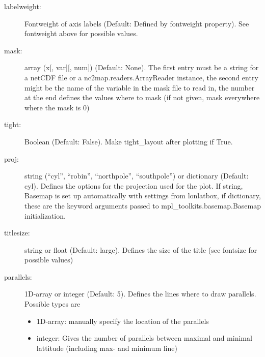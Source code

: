 \begin{description}
    \item[\gls*{labelweight}:] \label{item:labelweight}  Fontweight of axis labels (Default: Defined by fontweight property). See fontweight above for possible values.
    \item[\gls*{mask}:] \label{item:mask}  array (x[, var][, num]) (Default: None). The first entry must be a string for a netCDF file or a nc2map.readers.ArrayReader instance, the second entry might be the name of the variable in the mask file to read in, the number at the end defines the values where to mask (if not given, mask everywhere where the mask is 0)
    \item[\gls*{tight}:] \label{item:tight} Boolean (Default: False). Make tight\_layout after plotting if True.
    \item[\gls*{proj}:] \label{item:proj}  string (\enquote{cyl}, \enquote{robin}, \enquote{northpole}, \enquote{southpole}) or dictionary (Default: cyl). Defines the options for the projection used for the plot. If string, Basemap is set up automatically with settings from lonlatbox, if dictionary, these are the keyword arguments passed to mpl\_toolkits.basemap.Basemap initialization.
    \item[\gls*{titlesize}:] \label{item:titlesize}  string or float (Default: large). Defines the size of the title (see fontsize for possible values)
    \item[\gls*{parallels}:] \label{item:parallels}  1D-array or integer (Default: 5). Defines the lines where to draw parallels. Possible types are
\begin{itemize}
    \item 1D-array: manually specify the location of the parallels
    \item integer: Gives the number of parallels between maximal and minimal lattitude (including max- and minimum line)
\end{itemize}


\end{description}
